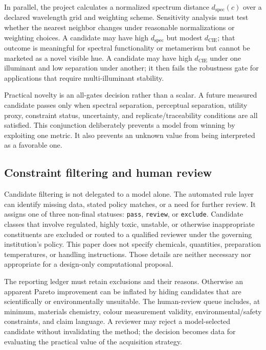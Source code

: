 \documentclass[conference]{IEEEtran}
\begin{document}
In parallel, the project calculates a normalized spectrum distance $d_{\mathrm{spec}}(c)$ over a declared wavelength grid and weighting scheme. Sensitivity analysis must test whether the nearest neighbor changes under reasonable normalizations or weighting choices. A candidate may have high $d_{\mathrm{spec}}$ but modest $d_{\mathrm{CIE}}$; that outcome is meaningful for spectral functionality or metamerism but cannot be marketed as a novel visible hue. A candidate may have high $d_{\mathrm{CIE}}$ under one illuminant and low separation under another; it then fails the robustness gate for applications that require multi-illuminant stability.

Practical novelty is an all-gates decision rather than a scalar. A future measured candidate passes only when spectral separation, perceptual separation, utility proxy, constraint status, uncertainty, and replicate/traceability conditions are all satisfied. This conjunction deliberately prevents a model from winning by exploiting one metric. It also prevents an unknown value from being interpreted as a favorable one.

\subsection{Constraint filtering and human review}

Candidate filtering is not delegated to a model alone. The automated rule layer can identify missing data, stated policy matches, or a need for further review. It assigns one of three non-final statuses: \texttt{pass}, \texttt{review}, or \texttt{exclude}. Candidate classes that involve regulated, highly toxic, unstable, or otherwise inappropriate constituents are excluded or routed to a qualified reviewer under the governing institution's policy. This paper does not specify chemicals, quantities, preparation temperatures, or handling instructions. Those details are neither necessary nor appropriate for a design-only computational proposal.

The reporting ledger must retain exclusions and their reasons. Otherwise an apparent Pareto improvement can be inflated by hiding candidates that are scientifically or environmentally unsuitable. The human-review queue includes, at minimum, materials chemistry, colour measurement validity, environmental/safety constraints, and claim language. A reviewer may reject a model-selected candidate without invalidating the method; the decision becomes data for evaluating the practical value of the acquisition strategy.
\end{document}
